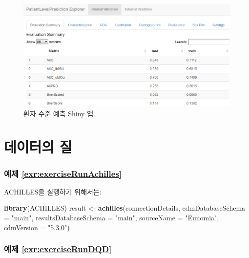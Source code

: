 \documentclass[11pt]{book}
\newenvironment{Shaded}{\begin{snugshade}}{\end{snugshade}}
\newcommand{\KeywordTok}[1]{\textcolor[rgb]{0.13,0.29,0.53}{\textbf{#1}}}
\newcommand{\DataTypeTok}[1]{\textcolor[rgb]{0.13,0.29,0.53}{#1}}
\newcommand{\StringTok}[1]{\textcolor[rgb]{0.31,0.60,0.02}{#1}}
\newcommand{\NormalTok}[1]{#1}
\theoremstyle{definition}
\theoremstyle{definition}
\theoremstyle{definition}
\theoremstyle{remark}
\begin{document}
\begin{figure}

{\centering \includegraphics[width=1\linewidth]{images/SuggestedAnswers/plpShiny} 

}

\caption{환자 수준 예측 Shiny 앱.}\label{fig:plpShiny}
\end{figure}

\section{데이터의 질}\label{DataQualityanswers}

\subsubsection*{예제
\ref{exr:exerciseRunAchilles}}\label{-refexrexerciserunachilles}

ACHILLES을 실행하기 위해서는:

\begin{Shaded}
\begin{Highlighting}[]
\KeywordTok{library}\NormalTok{(ACHILLES)}
\NormalTok{result <-}\StringTok{ }\KeywordTok{achilles}\NormalTok{(connectionDetails,}
                   \DataTypeTok{cdmDatabaseSchema =} \StringTok{"main"}\NormalTok{,}
                   \DataTypeTok{resultsDatabaseSchema =} \StringTok{"main"}\NormalTok{,}
                   \DataTypeTok{sourceName =} \StringTok{"Eunomia"}\NormalTok{,}
                   \DataTypeTok{cdmVersion =} \StringTok{"5.3.0"}\NormalTok{)}
\end{Highlighting}
\end{Shaded}

\subsubsection*{예제
\ref{exr:exerciseRunDQD}}\label{-refexrexerciserundqd}
\end{document}

